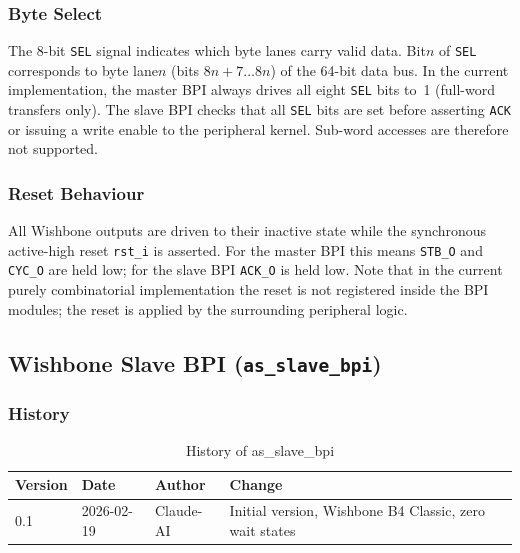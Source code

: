 \subsubsection{Byte Select}

The 8-bit \texttt{SEL} signal indicates which byte lanes carry valid data.
Bit\;$n$ of \texttt{SEL} corresponds to byte lane\;$n$ (bits $8n+7\ldots 8n$)
of the 64-bit data bus.
In the current implementation, the master BPI always drives all eight
\texttt{SEL} bits to~1 (full-word transfers only).
The slave BPI checks that all \texttt{SEL} bits are set before asserting
\texttt{ACK} or issuing a write enable to the peripheral kernel.
Sub-word accesses are therefore not supported.

\subsubsection{Reset Behaviour}

All Wishbone outputs are driven to their inactive state while the synchronous
active-high reset \texttt{rst\_i} is asserted.
For the master BPI this means \texttt{STB\_O} and \texttt{CYC\_O} are held
low; for the slave BPI \texttt{ACK\_O} is held low.
Note that in the current purely combinatorial implementation the reset
is not registered inside the BPI modules; the reset is applied by the
surrounding peripheral logic.

\subsection{Wishbone Slave BPI (\texttt{as\_slave\_bpi})}
\label{subsec:asSlaveBpi}

\subsubsection{History}
\begin{table}[H]
\caption{History of as\_slave\_bpi}
\label{tab:asSlaveBpiHist}
\centering
\begin{tabularx}{\textwidth}{|l |l |l |X|}
  \hline
  Version & Date & Author & Change \\
  \hline
  \hline
  0.1 & 2026-02-19 & Claude-AI & Initial version, Wishbone B4 Classic, zero wait states \\
  \hline
\end{tabularx}
\end{table}

